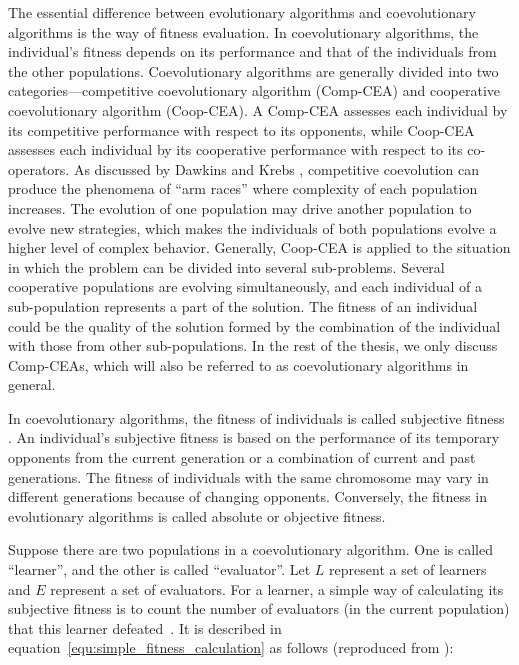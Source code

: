 The essential difference between evolutionary algorithms and coevolutionary algorithms is the way of fitness evaluation. In coevolutionary algorithms, the individual's fitness depends on its performance and that of the individuals from the other populations. Coevolutionary algorithms are generally divided into two categories---competitive coevolutionary algorithm (Comp-CEA) and cooperative coevolutionary algorithm (Coop-CEA). A Comp-CEA assesses each individual by its competitive performance with respect to its opponents, while Coop-CEA assesses each individual by its cooperative performance with respect to its co-operators. As discussed by Dawkins and Krebs \cite{Dawkins_1979}, competitive coevolution can produce the phenomena of ``arm races'' where complexity of each population increases. The evolution of one population may drive another population to evolve new strategies, which makes the individuals of both populations evolve a higher level of complex behavior. Generally, Coop-CEA is applied to the situation in which the problem can be divided into several sub-problems. Several cooperative populations are evolving simultaneously, and each individual of a sub-population represents a part of the solution. The fitness of an individual could be the quality of the solution formed by the combination of the individual with those from other sub-populations. In the rest of the thesis, we only discuss Comp-CEAs, which will also be referred to as coevolutionary algorithms in general.

In coevolutionary algorithms, the fitness of individuals is called subjective fitness \cite{John_2004}. An individual's subjective fitness is based on the performance of its temporary opponents from the current generation or a combination of current and past generations. The fitness of individuals with the same chromosome may vary in different generations because of changing opponents. Conversely, the fitness in evolutionary algorithms is called absolute or objective fitness.

Suppose there are two populations in a coevolutionary algorithm. One is called ``learner'', and the other is called ``evaluator''. Let $L$ represent a set of learners and $E$ represent a set of evaluators. For a learner, a simple way of calculating its subjective fitness is to count the number of evaluators (in the current population) that this learner defeated~\cite{Angeline_1993}. It is described in equation~\eqref{equ:simple_fitness_calculation} as follows (reproduced from \cite{BiLi2009}):

